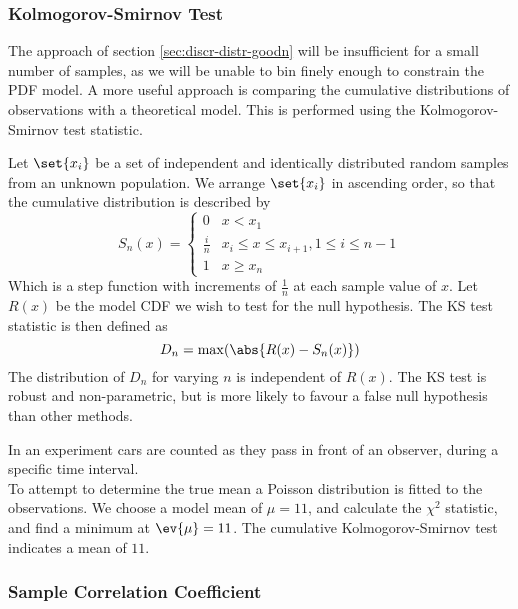 \documentclass{dwnotes}         		        %
\begin{document}
\subsubsection{Kolmogorov-Smirnov Test}
\label{sec:kolm-smirn-test}

The approach of section \ref{sec:discr-distr-goodn} will be
insufficient for a small number of samples, as we will be unable to
bin finely enough to constrain the PDF model. A more useful approach
is comparing the cumulative distributions of observations with a
theoretical model. This is performed using the Kolmogorov-Smirnov test
statistic.

Let $\set{x_i}$ be a set of independent and identically distributed
random samples from an unknown population. We arrange $\set{x_i}$ in
ascending order, so that the cumulative distribution is described by
\[ S_n(x) =
\begin{cases}
  0 & x < x_1 \\ \frac{i}{n} & x_i \le x \le x_{i+1}, 1 \le i \le n-1 \\
1 & x \ge x_n
\end{cases}
\]
Which is a step function with increments of $\frac{1}{n}$ at each
sample value of $x$. Let $R(x)$ be the model CDF we wish to test for
the null hypothesis. The KS test statistic is then defined as 
\begin{equation}
  \label{eq:6}
  D_n = \max( \abs{R(x) - S_n(x)} )
\end{equation}
The distribution of $D_n$ for varying $n$ is independent of
$R(x)$. The KS test is robust and non-parametric, but is more likely
to favour a false null hypothesis than other methods.

\begin{example}
  In an experiment cars are counted as they pass in front of an
  observer, during a specific time interval.\\ To attempt to determine
  the true mean a Poisson distribution is fitted to the
  observations. We choose a model mean of $\mu=11$, and calculate the
  $\chi^2$ statistic, and find a minimum at $\ev{\mu}=11$. The
  cumulative Kolmogorov-Smirnov test indicates a mean of $11$.
\end{example}

\subsubsection{Sample Correlation Coefficient}
\label{sec:sample-corr-coeff}
\end{document}
